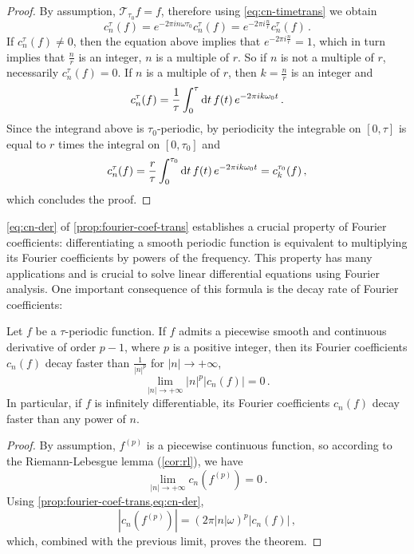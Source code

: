 \begin{proof}
	By assumption, $\mathcal{T}_{\tau_0}f=f$, therefore using \cref{eq:cn-timetrans} we
	obtain
	\begin{equation}
		c_n^\tau(f)=e^{-2\pi i n\omega \tau_0}c_n^\tau(f)=e^{-2\pi i
				\frac{n}{r}}c_n^\tau(f)\,.
	\end{equation}
	If $c_n^\tau(f)\neq 0$, then the equation above implies that $e^{-2\pi i
				\frac{n}{r}}=1$, which in turn implies that $\frac{n}{r}$ is an integer, \ie $n$ is a
	multiple of $r$. So if $n$ is not a multiple of $r$, necessarily $c_n^\tau(f)=0$. If $n$
	is a multiple of $r$, then $k=\frac{n}{r}$ is an integer and
	\begin{equation}
		c_n^\tau(f)=\frac{1}{\tau}\int_{0}^{\tau}\mathrm{d} t\,f(t)\,e^{-2\pi i k\omega_0 t}\,.
	\end{equation}
	Since the integrand above is $\tau_0$-periodic, by periodicity the integrable on
	$[0,\tau]$ is equal to $r$ times the integral on $[0,\tau_0]$ and
	\begin{equation}
		c_n^\tau(f)=\frac{r}{\tau}\int_{0}^{\tau_0}\mathrm{d} t\,f(t)\,
		e^{-2\pi i k\omega_0 t}=c_{k}^{\tau_0}(f)\,,
	\end{equation}
	which concludes the proof.
\end{proof}
\cref{eq:cn-der} of \cref{prop:fourier-coef-trans} establishes a crucial property of
Fourier coefficients: differentiating a smooth periodic function is equivalent to
multiplying its Fourier coefficients by powers of the frequency. This property has many
applications and is crucial to solve linear differential equations using Fourier analysis.
One important consequence of this formula is the decay rate of Fourier coefficients:
\begin{theorem}
	\label{thm:fourier-series-decay}
	Let $f$ be a $\tau$-periodic function. If $f$ admits a piecewise smooth and continuous
	derivative of order $p-1$, where $p$ is a positive integer, then its Fourier
	coefficients $c_n(f)$ decay faster than $\frac{1}{|n|^p}$ for $|n|\to+\infty$, \ie
	\begin{equation}
		\lim_{|n|\to+\infty} |n|^p|c_n(f)|=0\,.
	\end{equation}
	In particular, if $f$ is infinitely differentiable, its Fourier coefficients $c_n(f)$
	decay faster than any power of $n$.
\end{theorem}
\begin{proof}
	By assumption, $f^{(p)}$ is a piecewise continuous function, so according to the
	Riemann-Lebesgue lemma (\cref{cor:rl}), we have
	\begin{equation}
		\lim_{|n|\to+\infty} c_n(f^{(p)})=0\,.
	\end{equation}
	Using \cref{prop:fourier-coef-trans,eq:cn-der},
	\begin{equation}
		|c_n(f^{(p)})|=(2\pi |n|\omega)^p|c_n(f)|\,,
	\end{equation}
	which, combined with the previous limit, proves the theorem.
\end{proof}
